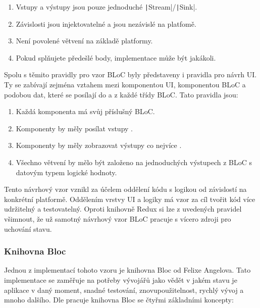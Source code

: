 \begin{enumerate}
    \item Vstupy a výstupy jsou pouze jednoduché
    \texttt|Stream|/\texttt|Sink|.
    \item Závislosti jsou injektovatelné a jsou nezávislé na platfomě.
    \item Není povolené větvení na základě platformy.
    \item Pokud splňujete předešlé body,
    implementace může být jakákoli.
\end{enumerate}

Spolu s těmito pravidly pro vzor BLoC byly představeny
\cite{googledevelopers_bloc} i pravidla pro návrh UI.
Ty se zabívají zejména vztahem mezi komponentou UI, komponentou BLoC
a podobou dat,
které se posílají do a z každé třídy BLoC.
Tato pravidla jsou:

\begin{enumerate}
    \item Každá  komponenta má svůj příslušný BLoC.
    \item Komponenty by měly posílat vstupy .
    \item Komponenty by měly zobrazovat výstupy co nejvíce .
    \item Všechno větvení by mělo být založeno na jednoduchých výstupech z BLoC
    s datovým typem logické hodnoty.
\end{enumerate}

Tento návrhový vzor vznikl za účelem oddělení kódu s logikou
od závislostí na konkrétní platformě.
Oddělením vrstvy UI a logiky má vzor za cíl tvořit kód více udržitelný a
testovatelný. \cite{flutterando_analyzing_bloc_mobx}
Oproti knihovně Redux si lze z uvedených pravidel všimnout,
že už samotný návrhový vzor BLoC pracuje s vícero zdroji pro uchování stavu.

\subsubsection{Knihovna Bloc}

Jednou z implementací tohoto vzoru je knihovna Bloc od Felixe Angelova.
\cite{bloclibrary_whybloc}
Tato implementace se zaměřuje na potřeby vývojářů jako
vědět v jakém stavu je aplikace v daný moment, snadné testování,
znovupoužitelnost, rychlý vývoj a mnoho dalšího. 
Dle \cite{bloclibrary_coreconcepts} pracuje knihovna Bloc se čtyřmi základními
koncepty: 

